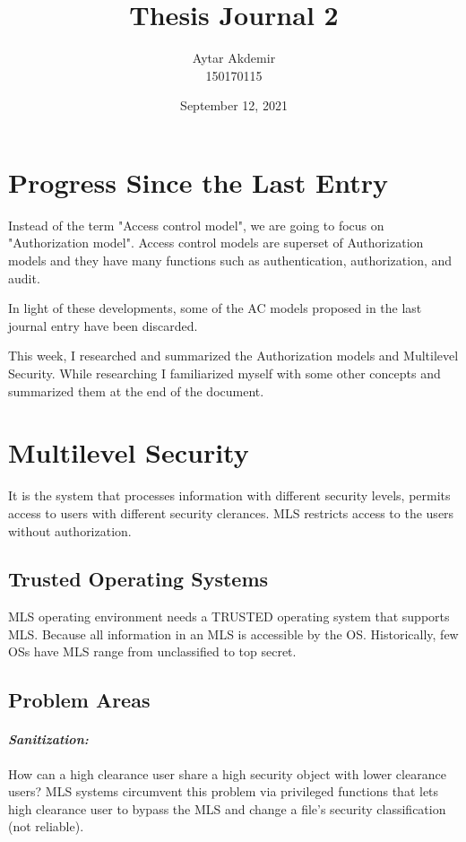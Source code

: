 \documentclass[11pt]{article} %
\title{Thesis Journal 2}
\author{Aytar Akdemir \\ 150170115}
\date{September 12, 2021} %
\begin{document}
\maketitle

\section{Progress Since the Last Entry}

Instead of the term "Access control model", we are going to focus on "Authorization model".
Access control models are superset of Authorization models and they have many functions such as  authentication, authorization, and audit.

In light of these developments, some of the AC models proposed in the last journal entry have been discarded.

This week, I researched and summarized the Authorization models and Multilevel Security.
While researching I familiarized myself with some other concepts and summarized them at the end of the document.



\section{Multilevel Security}

It is the system that processes information with different security levels, permits access to users with different security clerances.
MLS restricts access to the users without authorization.

\subsection{Trusted Operating Systems}

MLS operating environment needs a TRUSTED operating system that supports MLS.
Because all information in an MLS  is accessible by the OS.
Historically, few OSs have MLS range from unclassified to top secret.

\subsection{Problem Areas}

\paragraph{\textit{Sanitization:}} How can a high clearance user share a high security object with lower clearance users?
MLS systems circumvent this problem via privileged functions that lets high clearance user to bypass the MLS and change a file's security classification (not reliable). 
\end{document}
